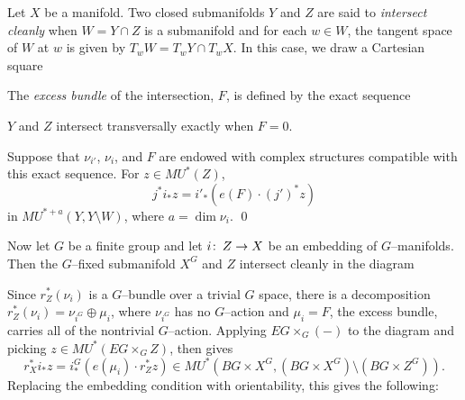 \begin{definition}
Let $X$ be a manifold.  Two closed submanifolds $Y$ and $Z$ are said to \textit{intersect cleanly} when $W = Y \cap Z$ is a submanifold and for each $w \in W$, the tangent space of $W$ at $w$ is given by $T_w W = T_w Y \cap T_w X$.  In this case, we draw a Cartesian square
\begin{center}
\end{center}
The \textit{excess bundle} of the intersection, $F$, is defined by the exact sequence
\begin{center}
\end{center}
\end{definition}

\begin{remark}
$Y$ and $Z$ intersect transversally exactly when $F = 0$.
\end{remark}

\begin{lemma}\label{CleanIntersectionFormula}
Suppose that $\nu_{i'}$, $\nu_i$, and $F$ are endowed with complex structures compatible with this exact sequence. For $z \in MU^*(Z)$, \[j^* i_* z = i'_*(e(F) \cdot (j')^* z)\] in $MU^{*+a}(Y, Y \setminus W)$, where $a = \dim \nu_i$. \qed {}
\end{lemma}

Now let $G$ be a finite group and let $i\colon\thinspace Z \to X$ be an embedding of $G$--manifolds. Then the $G$--fixed submanifold $X^G$ and $Z$ intersect cleanly in the diagram
\begin{center}
\end{center}
Since $r_Z^*(\nu_i)$ is a $G$--bundle over a trivial $G$ space, there is a decomposition $r_Z^*(\nu_i) = \nu_{i^G} \oplus \mu_i$, where $\nu_{i^G}$ has no $G$--action and $\mu_i = F$, the excess bundle, carries all of the nontrivial $G$--action.  Applying $EG \times_G (-)$ to the diagram and picking $z \in MU^*(EG \times_G Z)$,  then gives \[r_X^* i_* z = i^G_*(e(\mu_i) \cdot r_Z^* z) \in MU^*(BG \times X^G, (BG \times X^G) \setminus (BG \times Z^G)).\]  Replacing the embedding condition with orientability, this gives the following:

